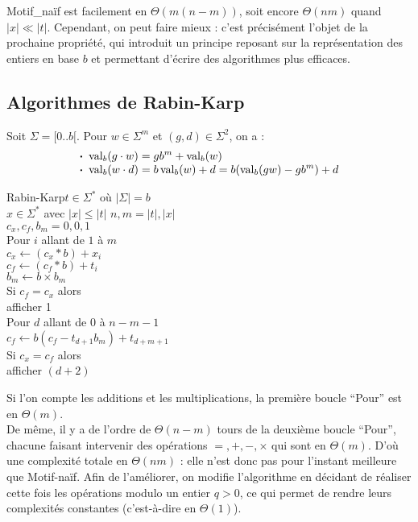 		\textsf{Motif\_naïf} est facilement en \(\Theta(m(n-m))\), soit encore \(\Theta(nm)\) quand \(|x| \ll |t|\). Cependant, on peut faire mieux : c'est précisément l'objet de la prochaine propriété, qui introduit un principe reposant sur la représentation des entiers en base \(b\) et permettant d'écrire des algorithmes plus efficaces.
	
	\subsection{Algorithmes de Rabin-Karp}
	
		\begin{Propriete}
			Soit \(\Sigma = [0..b[\). Pour \(w \in \Sigma^m\) et \((g,d)\in\Sigma^2\), on a :
				\begin{align*}
					& \text{\(\bm{\cdot}\) } \operatorname{val}_b(g\cdot w) = gb^m + \operatorname{val}_b(w) \\[-1mm]
					& \text{\(\bm{\cdot}\) } \operatorname{val}_b(w\cdot d) = b\operatorname{val}_b(w) + d = b (\operatorname{val}_b(gw) - gb^m) + d
				\end{align*}
		\end{Propriete}
		
		\begin{algo}{Rabin-Karp}{\(t\in\Sigma^*\) où \(|\Sigma|=b\) \\ \aentspace \(x\in\Sigma^*\) avec \(|x| \leq |t|\)}{}{}
			\(n,m = |t|, |x|\) \\
			\(c_x, c_f, b_m = 0,0,1\) \\
			Pour \(i\) allant de \(1\) à \(m\) \\ \Indp
				\(c_x \gets (c_x * b) + x_i \) \\
				\(c_f \gets (c_f * b) + t_i\) \\
				\(b_m \gets b \times b_m\) \\ \Indm
			Si \(c_f = c_x\) alors  \\ \Indp afficher 1 \\ \Indm
			Pour \(d\) allant de 0 à \(n-m-1\) \\ \Indp
				\(c_f \gets b(c_f - t_{d+1}b_m) + t_{d+m+1}\) \\
				Si \(c_x = c_f\) alors \\ \Indp
					afficher \((d+2)\)
		\end{algo}
		
		\bdot Si l'on compte les additions et les multiplications, la première boucle ``Pour'' est en \(\Theta(m)\). \\ 
		\bdot De même, il y a de l'ordre de \(\Theta(n-m)\) tours de la deuxième boucle ``Pour'', chacune faisant intervenir des opérations \(=,+,-,\times\) qui sont en \(\Theta(m)\). \nt
		D'où une complexité totale en \(\Theta(nm)\) : elle n'est donc pas pour l'instant meilleure que \textsf{Motif-naïf}. \nll
		Afin de l'améliorer, on modifie l'algorithme en décidant de réaliser cette fois les opérations modulo un entier \(q > 0\), ce qui permet de rendre leurs complexités constantes (c'est-à-dire en \(\Theta(1)\)).
		
